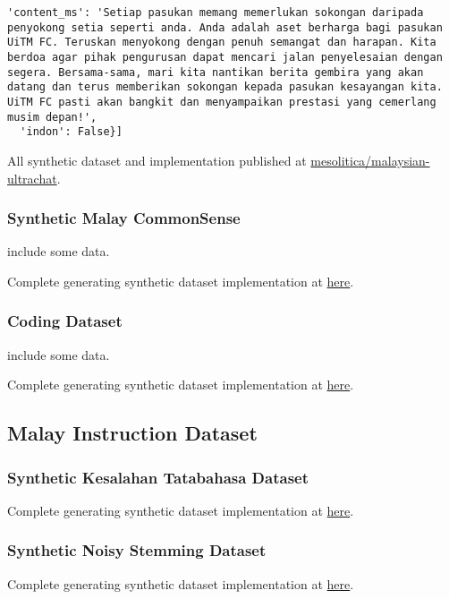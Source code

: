 \documentclass{article}
\begin{document}
\begin{lstlisting}[breaklines=true]
  'content_ms': 'Setiap pasukan memang memerlukan sokongan daripada penyokong setia seperti anda. Anda adalah aset berharga bagi pasukan UiTM FC. Teruskan menyokong dengan penuh semangat dan harapan. Kita berdoa agar pihak pengurusan dapat mencari jalan penyelesaian dengan segera. Bersama-sama, mari kita nantikan berita gembira yang akan datang dan terus memberikan sokongan kepada pasukan kesayangan kita. UiTM FC pasti akan bangkit dan menyampaikan prestasi yang cemerlang musim depan!',
  'indon': False}]
\end{lstlisting}

All synthetic dataset and implementation published at \href{https://huggingface.co/datasets/mesolitica/malaysian-ultrachat}{mesolitica/malaysian-ultrachat}.

\subsubsection{Synthetic Malay CommonSense}

include some data.

Complete generating synthetic dataset implementation at \href{https://a.com}{here}.

\subsubsection{Coding Dataset}

include some data.

Complete generating synthetic dataset implementation at \href{https://a.com}{here}.

\subsection{Malay Instruction Dataset}

\subsubsection{Synthetic Kesalahan Tatabahasa Dataset}

Complete generating synthetic dataset implementation at \href{https://a.com}{here}.

\subsubsection{Synthetic Noisy Stemming Dataset}

Complete generating synthetic dataset implementation at \href{https://a.com}{here}.
\end{document}
